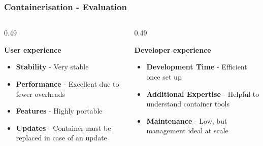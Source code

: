 \begin{frame}
\frametitle{Containerisation - Evaluation}


\begin{columns}[T,onlytextwidth] %
    \begin{column}{0.49\textwidth}
        \begin{theorembox}
        \textbf{User experience} 
        \vspace{5pt}
        \begin{itemize}
            \item \textbf{Stability} - Very stable
            \item \textbf{Performance} - Excellent due to fewer overheads
            \item \textbf{Features} - Highly portable
            \item \textbf{Updates} - Container must be replaced in case of an update \cite{docker-docs}
        \end{itemize}
        \end{theorembox}
    \end{column}

    \begin{column}{0.49\textwidth}
        \begin{theorembox}
        \textbf{Developer experience} 
        \vspace{5pt}
        \begin{itemize}
            \item \textbf{Development Time} - Efficient once set up
            \item \textbf{Additional Expertise} - Helpful to understand container tools
            \item \textbf{Maintenance} - Low, but management ideal at scale
        \end{itemize}
        \vspace{1pt}
        \end{theorembox}
    \end{column}
\end{columns}


\end{frame}


